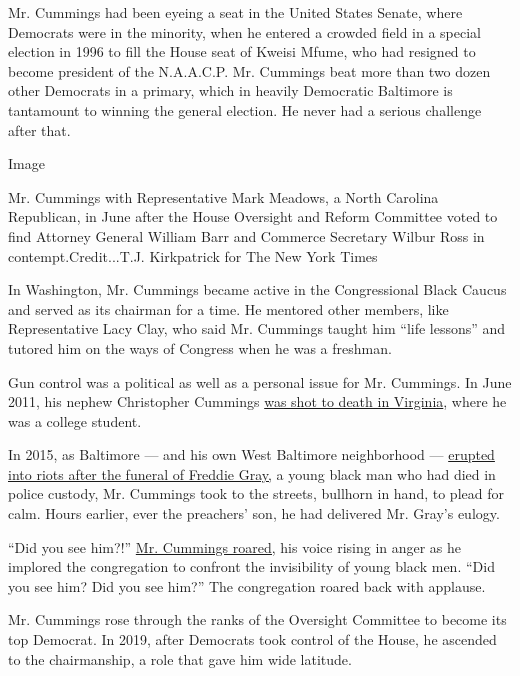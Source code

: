 Mr. Cummings had been eyeing a seat in the United States Senate, where
Democrats were in the minority, when he entered a crowded field in a
special election in 1996 to fill the House seat of Kweisi Mfume, who had
resigned to become president of the N.A.A.C.P. Mr. Cummings beat more
than two dozen other Democrats in a primary, which in heavily Democratic
Baltimore is tantamount to winning the general election. He never had a
serious challenge after that.

Image

Mr. Cummings with Representative Mark Meadows, a North Carolina
Republican, in June after the House Oversight and Reform Committee voted
to find Attorney General William Barr and Commerce Secretary Wilbur Ross
in contempt.Credit...T.J. Kirkpatrick for The New York Times

In Washington, Mr. Cummings became active in the Congressional Black
Caucus and served as its chairman for a time. He mentored other members,
like Representative Lacy Clay, who said Mr. Cummings taught him ``life
lessons'' and tutored him on the ways of Congress when he was a
freshman.

Gun control was a political as well as a personal issue for Mr.
Cummings. In June 2011, his nephew Christopher Cummings
\href{https://www.baltimoresun.com/news/bs-xpm-2011-06-13-bs-md-cummings-homicide-20110612-story.html}{was
shot to death in Virginia}, where he was a college student.

In 2015, as Baltimore --- and his own West Baltimore neighborhood ---
\href{https://www.nytimes.com/2015/04/28/us/baltimore-freddie-gray.html?rref=collection\%2Fbyline\%2Fsheryl-gay-stolberg\&action=click\&contentCollection=undefined\&region=stream\&module=stream_unit\&version=search\&contentPlacement=7\&pgtype=collection}{erupted
into riots after the funeral of Freddie Gray,} a young black man who had
died in police custody, Mr. Cummings took to the streets, bullhorn in
hand, to plead for calm. Hours earlier, ever the preachers' son, he had
delivered Mr. Gray's eulogy.

``Did you see him?!''
\href{https://www.baltimoresun.com/82dc6d8d-529f-43e3-84c9-c28ed335a89e-132.html}{Mr.
Cummings roared,} his voice rising in anger as he implored the
congregation to confront the invisibility of young black men. ``Did you
see him? Did you see him?'' The congregation roared back with applause.

Mr. Cummings rose through the ranks of the Oversight Committee to become
its top Democrat. In 2019, after Democrats took control of the House, he
ascended to the chairmanship, a role that gave him wide latitude.


